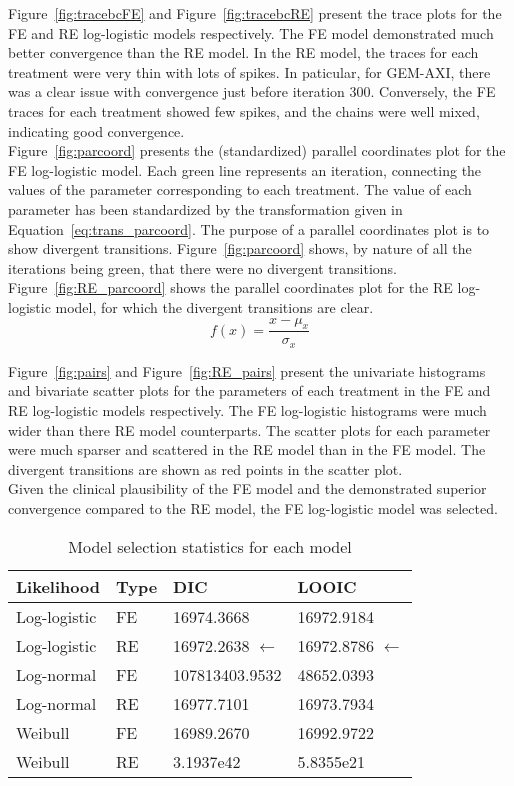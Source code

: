 Figure~\ref{fig:tracebcFE} and Figure~\ref{fig:tracebcRE} present the trace plots for the FE and RE log-logistic models respectively. The FE model demonstrated much better convergence than the RE model. In the RE model, the traces for each treatment were very thin with lots of spikes. In paticular, for GEM-AXI, there was a clear issue with convergence just before iteration 300. Conversely, the FE traces for each treatment showed few spikes, and the chains were well mixed, indicating good convergence. \\

Figure~\ref{fig:parcoord} presents the (standardized) parallel coordinates plot for the FE log-logistic model. Each green line represents an iteration, connecting the values of the parameter corresponding to each treatment. The value of each parameter has been standardized by the transformation given in Equation~\ref{eq:trans_parcoord}. The purpose of a parallel coordinates plot is to show divergent transitions. Figure~\ref{fig:parcoord} shows, by nature of all the iterations being green, that there were no divergent transitions. Figure~\ref{fig:RE_parcoord} shows the parallel coordinates plot for the RE log-logistic model, for which the divergent transitions are clear.\\

\begin{equation}
    f(x) = \frac{x - \mu_x}{\sigma_x}
    \label{eq:trans_parcoord}
\end{equation}

Figure~\ref{fig:pairs} and Figure~\ref{fig:RE_pairs} present the univariate histograms and bivariate scatter plots for the parameters of each treatment in the FE and RE log-logistic models respectively. The FE log-logistic histograms were much wider than there RE model counterparts. The scatter plots for each parameter were much sparser and scattered in the RE model than in the FE model. The divergent transitions are shown as red points in the scatter plot. \\

Given the clinical plausibility of the FE model and the demonstrated superior convergence compared to the RE model, the FE log-logistic model was selected.

\begin{table}[h]
    \centering
    \begin{tabular}{llll}
    \hline
    Likelihood   & Type & DIC         & LOOIC      \\ \hline
    Log-logistic & FE  & 16974.3668  & 16972.9184 \\
    Log-logistic & RE & 16972.2638  $\leftarrow$ & 16972.8786 $\leftarrow$ \\
    Log-normal   & FE  & 107813403.9532  & 48652.0393 \\
    Log-normal   & RE & 16977.7101  & 16973.7934 \\
    Weibull      & FE  & 16989.2670 & 16992.9722 \\
    Weibull      & RE & 3.1937e42 & 5.8355e21 \\ \hline
    \end{tabular}
    \caption{Model selection statistics for each model}
    \label{tab:selectionstatbc}
\end{table}

